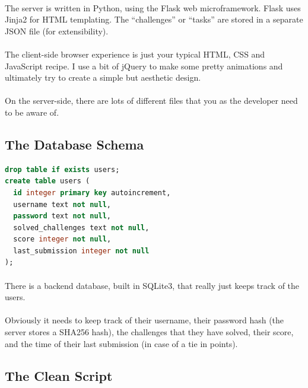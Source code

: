 \documentclass[11pt]{article}
\begin{document}
	\paragraph{} The server is written in Python, using the Flask web microframework. Flask uses Jinja2 for HTML templating. The ``challenges'' or ``tasks'' are stored in a separate JSON file (for extensibility). 

	\paragraph{} The client-side browser experience is just your typical HTML, CSS and JavaScript recipe. I use a bit of jQuery to make some pretty animations and ultimately try to create a simple but aesthetic design.

	\paragraph{} On the server-side, there are lots of different files that you as the developer need to be aware of.

	\subsection{The Database Schema}

	\begin{lstlisting}[language=sql]
drop table if exists users;
create table users (
  id integer primary key autoincrement,
  username text not null,
  password text not null,
  solved_challenges text not null,
  score integer not null,
  last_submission integer not null
);
\end{lstlisting}	

	\paragraph{} There is a backend database, built in SQLite3, that really just keeps track of the users. 

	\paragraph{} Obviously it needs to keep track of their username, their password hash (the server stores a SHA256 hash), the challenges that they have solved, their score, and the time of their last submission (in case of a tie in points).

\subsection{The Clean Script}
\end{document}

